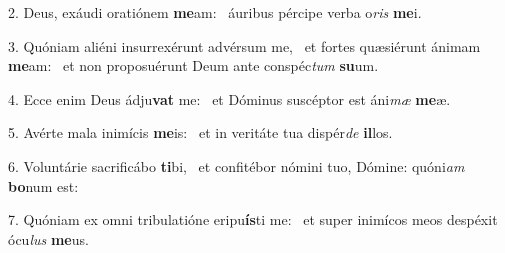 2. Deus, exáudi oratiónem \textbf{me}am: \ast\  áuribus pércipe verba o\textit{ris} \textbf{me}i.\

3. Quóniam aliéni insurrexérunt advérsum me, \dag\  et fortes quæsiérunt ánimam \textbf{me}am: \ast\  et non proposuérunt Deum ante conspéc\textit{tum} \textbf{su}um.\

4. Ecce enim Deus ádju\textbf{vat} me: \ast\  et Dóminus suscéptor est áni\textit{mæ} \textbf{me}æ.\

5. Avérte mala inimícis \textbf{me}is: \ast\  et in veritáte tua dispér\textit{de} \textbf{il}los.\

6. Voluntárie sacrificábo \textbf{ti}bi, \ast\  et confitébor nómini tuo, Dómine: quóni\textit{am} \textbf{bo}num est:\

7. Quóniam ex omni tribulatióne eripu\textbf{ís}ti me: \ast\  et super inimícos meos despéxit ócu\textit{lus} \textbf{me}us.\

